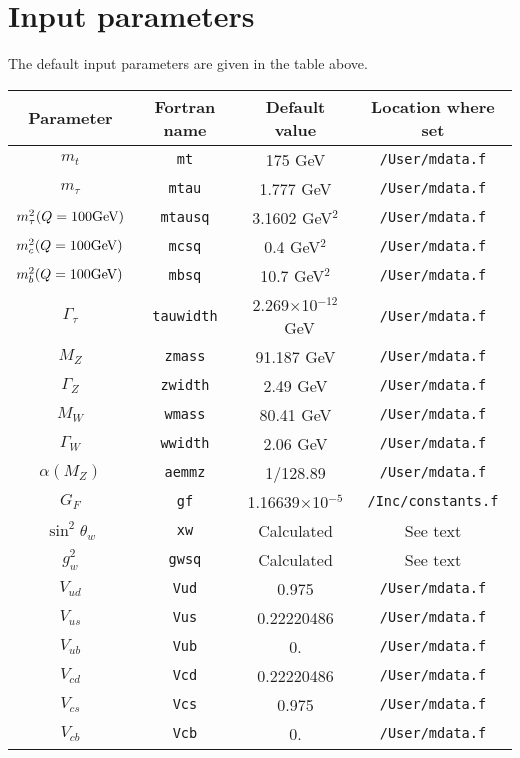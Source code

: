 \documentclass[12pt]{article}
\begin{document}
\section{Input parameters}
The default input parameters are given in the table above.
\begin{table}
\begin{center}
\begin{tabular}{|c|c|c|c|} \hline
Parameter & Fortran name & Default value & Location where set                 \\ 
\hline
$m_t$            & {\tt mt}      & 175 GeV             &{\tt /User/mdata.f}   \\
$m_\tau$         & {\tt mtau}      & 1.777 GeV           &{\tt /User/mdata.f}   \\
$m^2_\tau(Q=100\mbox{GeV})$& {\tt mtausq}  & 3.1602 GeV$^2$      &{\tt /User/mdata.f}   \\
$m^2_c(Q=100\mbox{GeV})$   & {\tt mcsq}    & 0.4  GeV$^2$        &{\tt /User/mdata.f}   \\
$m^2_b(Q=100\mbox{GeV})$   & {\tt mbsq}    & 10.7 GeV$^2$        &{\tt /User/mdata.f}   \\
$\Gamma_\tau$    & {\tt tauwidth}& 2.269$\times$10$^{-12}$~GeV
                                                       &{\tt /User/mdata.f}   \\
$M_Z$            & {\tt zmass}   & 91.187 GeV          &{\tt /User/mdata.f}   \\
$\Gamma_Z$       & {\tt zwidth}  & 2.49 GeV            &{\tt /User/mdata.f}   \\
$M_W$            & {\tt wmass}   & 80.41 GeV           &{\tt /User/mdata.f}   \\
$\Gamma_W$       & {\tt wwidth}  & 2.06 GeV            &{\tt /User/mdata.f}   \\
$\alpha(M_Z)$    & {\tt aemmz}   & 1/128.89            &{\tt /User/mdata.f}   \\
$G_F$            & {\tt gf}      & 1.16639$\times$10$^{-5}$
                                                       &{\tt /Inc/constants.f}\\
$\sin^2 \theta_w$& {\tt xw}      & Calculated          & See text             \\
$g^2_w$          & {\tt gwsq}    & Calculated          & See text             \\
$V_{ud}$         & {\tt Vud}     & 0.975               &{\tt /User/mdata.f}   \\
$V_{us}$         & {\tt Vus}     & 0.22220486          &{\tt /User/mdata.f}   \\
$V_{ub}$         & {\tt Vub}     & 0.                  &{\tt /User/mdata.f}   \\
$V_{cd}$         & {\tt Vcd}     & 0.22220486          &{\tt /User/mdata.f}   \\
$V_{cs}$         & {\tt Vcs}     & 0.975               &{\tt /User/mdata.f}   \\
$V_{cb}$         & {\tt Vcb}     & 0.                  &{\tt /User/mdata.f}   \\
\hline
\end{tabular}
\label{default} 
\end{center}
\end{table}
\end{document}
